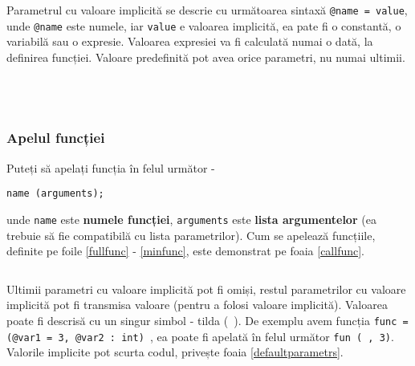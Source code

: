 Parametrul cu valoare implicită se descrie cu următoarea sintaxă \texttt{@name = value}, unde \texttt{@name} este numele, iar \texttt{value} e valoarea implicită, ea pate fi o constantă, o variabilă sau o expresie. Valoarea expresiei va fi calculată numai o dată, la definirea funcției. Valoare predefinită pot avea orice parametri, nu numai ultimii.

\begin{sourcecode}
	\label{fullfunc}
	\inputminted[linenos]{icl}{../sources/fullfunc.icL}
\end{sourcecode}

\begin{listing}[p]
	\label{noargsfunc}
	\inputminted[linenos]{icl}{../sources/noargsfunc.icL}
\end{listing}

\begin{listing}[p]
	\label{notypefunc}
	\inputminted[linenos]{icl}{../sources/notypefunc.icL}
\end{listing}

\begin{listing}[p]
	\label{minfunc}
	\inputminted[linenos]{icl}{../sources/minfunc.icL}
\end{listing}

\subsubsection{Apelul funcției}

Puteți să apelați funcția în felul următor -
\begin{verbatim}
name (arguments);
\end{verbatim}
unde \texttt{name} este {\bf numele funcției}, \texttt{arguments} este {\bf lista argumentelor} (ea trebuie să fie compatibilă cu lista parametrilor). Cum se apelează funcțiile, definite pe foile \ref{fullfunc} - \ref{minfunc}, este demonstrat pe foaia \ref{callfunc}.

\begin{listing}[h]
	\label{callfunc}
	\inputminted[linenos]{icl}{../sources/callfunc.icL}
\end{listing}

Ultimii parametri cu valoare implicită pot fi omiși, restul parametrilor cu valoare implicită pot fi transmisa valoare \void{} (pentru a folosi valoare implicită). Valoarea \void{} poate fi descrisă cu un singur simbol - tilda (\texttt{~}). De exemplu avem funcția \texttt{func = (@var1 = 3, @var2 : int) {}}, ea poate fi apelată în felul următor \texttt{fun (~, 3)}. Valorile implicite pot scurta codul, privește foaia \ref{defaultparametrs}.

